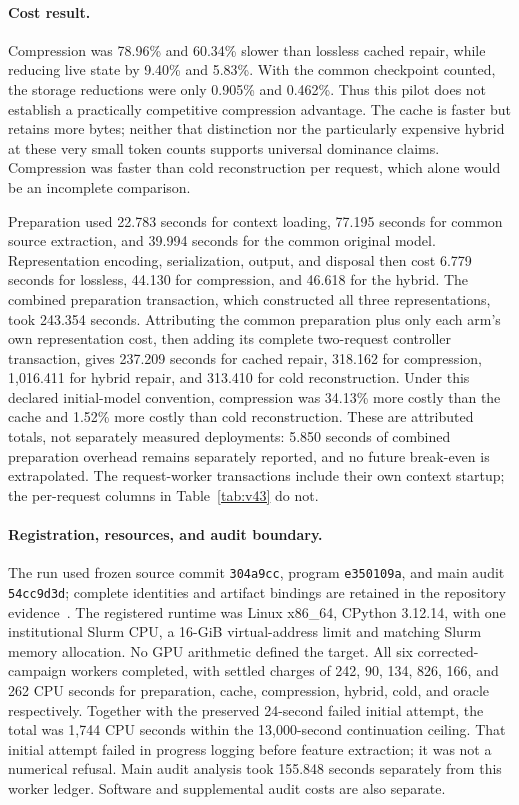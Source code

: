 \documentclass[10pt,twocolumn,letterpaper]{article}
\begin{document}
\paragraph{Cost result.}
Compression was 78.96\% and 60.34\% slower than lossless cached repair, while
reducing live state by 9.40\% and 5.83\%. With the common checkpoint counted, the
storage reductions were only 0.905\% and 0.462\%. Thus this pilot does not establish
a practically competitive compression advantage. The cache is faster but retains
more bytes; neither that distinction nor the particularly expensive hybrid at
these very small token counts supports universal dominance claims. Compression
was faster than cold reconstruction per request, which alone would be an
incomplete comparison.

Preparation used 22.783 seconds for context loading, 77.195 seconds for common
source extraction, and 39.994 seconds for the common original model. Representation
encoding, serialization, output, and disposal then cost 6.779 seconds for lossless,
44.130 for compression, and 46.618 for the hybrid. The combined preparation
transaction, which constructed all three representations, took 243.354 seconds.
Attributing the common preparation plus only each arm's own representation cost,
then adding its complete two-request controller transaction, gives 237.209 seconds
for cached repair, 318.162 for compression, 1,016.411 for hybrid repair, and 313.410
for cold reconstruction. Under this declared initial-model convention, compression
was 34.13\% more costly than the cache and 1.52\% more costly than cold
reconstruction. These are attributed totals, not separately measured deployments:
5.850 seconds of combined preparation overhead remains separately reported,
and no future break-even is extrapolated. The request-worker transactions include
their own context startup; the per-request columns in Table~\ref{tab:v43} do not.

\paragraph{Registration, resources, and audit boundary.}
The run used frozen source commit \texttt{304a9cc}, program \texttt{e350109a}, and
main audit \texttt{54cc9d3d}; complete identities and artifact bindings are retained
in the repository evidence~\cite{v43}. The registered runtime was Linux x86\_64,
CPython 3.12.14, with one institutional Slurm CPU, a 16-GiB virtual-address limit
and matching Slurm memory allocation. No GPU arithmetic defined the target.
All six corrected-campaign workers completed, with settled charges of 242, 90,
134, 826, 166, and 262 CPU seconds for preparation, cache, compression, hybrid,
cold, and oracle respectively. Together with the preserved 24-second failed
initial attempt, the total was 1,744 CPU seconds within the 13,000-second
continuation ceiling. That initial attempt failed in progress logging before
feature extraction; it was not a numerical refusal. Main audit analysis took
155.848 seconds separately from this worker ledger. Software and supplemental
audit costs are also separate.
\end{document}
